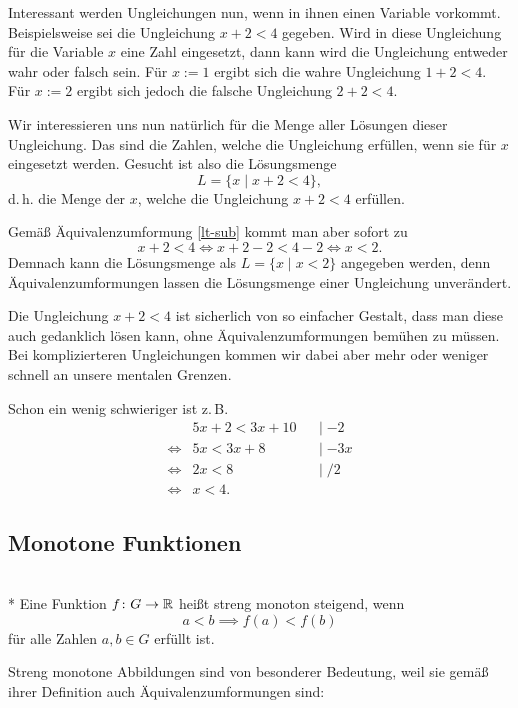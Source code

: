 Interessant werden Ungleichungen nun, wenn in ihnen einen Variable
vorkommt. Beispielsweise sei die Ungleichung $x+2<4$ gegeben.
Wird in diese Ungleichung für die Variable $x$ eine Zahl eingesetzt,
dann kann wird die Ungleichung entweder wahr oder falsch sein.
Für $x:=1$ ergibt sich die wahre Ungleichung $1+2<4$. Für $x:=2$
ergibt sich jedoch die falsche Ungleichung $2+2<4$.

Wir interessieren uns nun natürlich für die Menge aller Lösungen
dieser Ungleichung. Das sind die Zahlen, welche die Ungleichung
erfüllen, wenn sie für $x$ eingesetzt werden. Gesucht ist also
die Lösungsmenge
\[L = \{x\mid x+2<4\},\]
d.\,h. die Menge der $x$, welche die Ungleichung $x+2<4$ erfüllen.

Gemäß Äquivalenzumformung \eqref{lt-sub} kommt man aber sofort zu
\[x+2<4 \iff x+2-2<4-2 \iff x<2.\]
Demnach kann die Lösungsmenge als $L=\{x\mid x<2\}$ angegeben werden,
denn Äquivalenzumformungen lassen die Lösungsmenge einer Ungleichung
unverändert.

Die Ungleichung $x+2<4$ ist sicherlich von so einfacher Gestalt,
dass man diese auch gedanklich lösen kann, ohne Äquivalenzumformungen
bemühen zu müssen. Bei komplizierteren Ungleichungen kommen wir dabei
aber mehr oder weniger schnell an unsere mentalen Grenzen.

Schon ein wenig schwieriger ist z.\,B.
\begin{align*}
& 5x+2<3x+10 && |\;{-2}\\
\iff & 5x<3x+8 && |\;{-3x}\\
\iff & 2x<8 && |\;{/2}\\
\iff & x<4.
\end{align*}

\subsection{Monotone Funktionen}%

\begin{Definition}%
%
\mbox{}\\*
Eine Funktion $f\colon G\to\mathbb R$ heißt streng monoton steigend, wenn
\[a<b\implies f(a)<f(b)\]
für alle Zahlen $a,b\in G$ erfüllt ist.
\end{Definition}
Streng monotone Abbildungen sind von besonderer Bedeutung, weil
sie gemäß ihrer Definition auch Äquivalenzumformungen sind:


